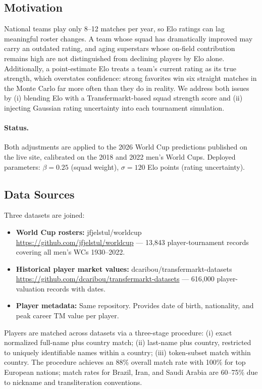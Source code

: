 \documentclass[11pt]{article}
\begin{document}
\subsection{Motivation}

National teams play only 8--12 matches per year, so Elo ratings can lag meaningful roster changes. A team whose squad has dramatically improved may carry an outdated rating, and aging superstars whose on-field contribution remains high are not distinguished from declining players by Elo alone. Additionally, a point-estimate Elo treats a team's current rating as its true strength, which overstates confidence: strong favorites win six straight matches in the Monte Carlo far more often than they do in reality. We address both issues by (i) blending Elo with a Transfermarkt-based squad strength score and (ii) injecting Gaussian rating uncertainty into each tournament simulation.

\paragraph{Status.} Both adjustments are applied to the 2026 World Cup predictions published on the live site, calibrated on the 2018 and 2022 men's World Cups. Deployed parameters: $\beta = 0.25$ (squad weight), $\sigma = 120$ Elo points (rating uncertainty).

\subsection{Data Sources}

Three datasets are joined:
\begin{itemize}[nosep]
    \item \textbf{World Cup rosters:} jfjelstul/worldcup \url{https://github.com/jfjelstul/worldcup} --- 13{,}843 player-tournament records covering all men's WCs 1930--2022.
    \item \textbf{Historical player market values:} dcaribou/transfermarkt-datasets \url{https://github.com/dcaribou/transfermarkt-datasets} --- 616{,}000 player-valuation records with dates.
    \item \textbf{Player metadata:} Same repository. Provides date of birth, nationality, and peak career TM value per player.
\end{itemize}

Players are matched across datasets via a three-stage procedure: (i) exact normalized full-name plus country match; (ii) last-name plus country, restricted to uniquely identifiable names within a country; (iii) token-subset match within country. The procedure achieves an 88\% overall match rate with 100\% for top European nations; match rates for Brazil, Iran, and Saudi Arabia are 60--75\% due to nickname and transliteration conventions.
\end{document}
